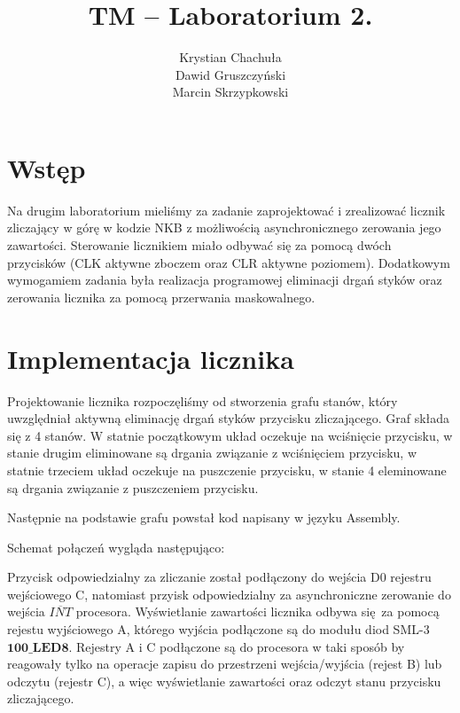 \documentclass[fleqn]{article}
\title{TM -- Laboratorium 2.}
\author{Krystian Chachuła \\ Dawid Gruszczyński \\ Marcin Skrzypkowski}
\begin{document}
\maketitle

\setcounter{page}{0}
\thispagestyle{empty}

\pagebreak

\setcounter{page}{1}

\section{Wstęp}

Na drugim laboratorium mieliśmy za zadanie zaprojektować i zrealizować licznik zliczający w górę w kodzie NKB z możliwością asynchronicznego zerowania jego zawartości.
Sterowanie licznikiem miało odbywać się za pomocą dwóch przycisków (CLK aktywne zboczem oraz CLR aktywne poziomem).
Dodatkowym wymogamiem zadania była realizacja programowej eliminacji drgań styków oraz zerowania licznika za pomocą przerwania maskowalnego.

\section{Implementacja licznika}

Projektowanie licznika rozpoczęliśmy od stworzenia grafu stanów, który uwzględniał aktywną eliminację drgań styków przycisku zliczającego.
Graf składa się z 4 stanów. W statnie początkowym układ oczekuje na wciśnięcie przycisku, w stanie drugim eliminowane są drgania związanie z wciśnięciem przycisku, w statnie trzeciem układ oczekuje na puszczenie przycisku, w stanie 4 eleminowane są drgania związanie z puszczeniem przycisku.


Następnie na podstawie grafu powstał kod napisany w języku Assembly.


Schemat połączeń wygląda następująco:


Przycisk odpowiedzialny za zliczanie został podłączony do wejścia D0 rejestru wejściowego C, natomiast przyisk odpowiedzialny za asynchroniczne zerowanie do wejścia $\overline{INT}$ procesora.
Wyświetlanie zawartości licznika odbywa się za pomocą rejestu wyjściowego A, którego wyjścia podłączone są do modułu diod SML-3 $\textbf{100\_LED8}$. Rejestry A i C podłączone są do procesora w taki sposób by reagowały tylko na operacje zapisu do przestrzeni wejścia/wyjścia (rejest B) lub odczytu (rejestr C), a więc wyświetlanie zawartości oraz odczyt stanu przycisku zliczającego.
\end{document}
